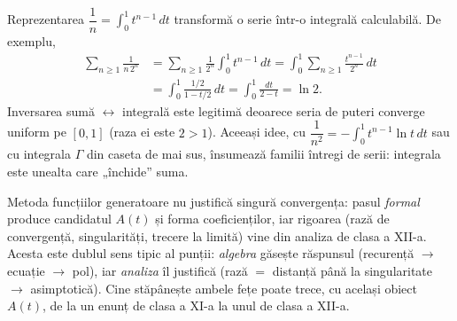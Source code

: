 \begin{exemplu}
Reprezentarea $\dfrac1n=\displaystyle\int_0^1t^{n-1}\,dt$ transformă o serie într-o integrală calculabilă. De exemplu,
\[
\begin{aligned}
\sum_{n\ge1}\frac{1}{n\,2^n}&=\sum_{n\ge1}\frac{1}{2^n}\int_0^1t^{n-1}\,dt=\int_0^1\sum_{n\ge1}\frac{t^{n-1}}{2^n}\,dt\\
&=\int_0^1\frac{1/2}{1-t/2}\,dt=\int_0^1\frac{dt}{2-t}=\ln2.
\end{aligned}
\]
Inversarea sumă $\leftrightarrow$ integrală este legitimă deoarece seria de puteri converge uniform pe $[0,1]$ (raza ei este $2>1$). Aceeași idee, cu $\dfrac{1}{n^2}=-\displaystyle\int_0^1t^{n-1}\ln t\,dt$ sau cu integrala $\Gamma$ din caseta de mai sus, însumează familii întregi de serii: integrala este unealta care „închide'' suma.
\end{exemplu}

\begin{obs}
Metoda funcțiilor generatoare nu justifică singură convergența: pasul \emph{formal} produce candidatul $A(t)$ și forma coeficienților, iar rigoarea (rază de convergență, singularități, trecere la limită) vine din analiza de clasa a XII-a. Acesta este dublul sens tipic al punții: \emph{algebra} găsește răspunsul (recurență $\to$ ecuație $\to$ pol), iar \emph{analiza} îl justifică (rază $=$ distanță până la singularitate $\to$ asimptotică). Cine stăpânește ambele fețe poate trece, cu același obiect $A(t)$, de la un enunț de clasa a XI-a la unul de clasa a XII-a.
\end{obs}

